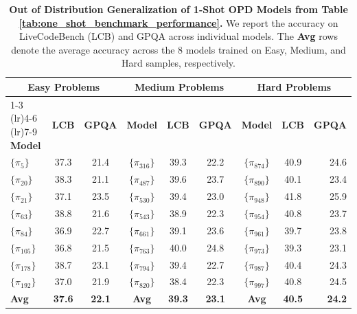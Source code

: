 \begin{table}[htbp]
\centering
\caption{\textbf{Out of Distribution Generalization of 1-Shot OPD Models from Table \ref{tab:one_shot_benchmark_performance}.} We report the accuracy on LiveCodeBench (LCB) and GPQA across individual models. The \textbf{Avg} rows denote the average accuracy across the 8 models trained on Easy, Medium, and Hard samples, respectively.}
\label{tab:ood_1shot_models}
\small
\begin{tabular}{lcccccccr}
\toprule
\multicolumn{3}{c}{\textbf{Easy Problems}} & \multicolumn{3}{c}{\textbf{Medium Problems}} & \multicolumn{3}{c}{\textbf{Hard Problems}} \\
\cmidrule(lr){1-3} \cmidrule(lr){4-6} \cmidrule(lr){7-9}
\textbf{Model} & \textbf{LCB} & \textbf{GPQA} & \textbf{Model} & \textbf{LCB} & \textbf{GPQA} & \textbf{Model} & \textbf{LCB} & \textbf{GPQA} \\
\midrule
$\{\pi_{5}\}$ & 37.3 & 21.4 & $\{\pi_{316}\}$ & 39.3 & 22.2 & $\{\pi_{874}\}$ & 40.9 & 24.6 \\
$\{\pi_{20}\}$ & 38.3 & 21.1 & $\{\pi_{487}\}$ & 39.6 & 23.7 & $\{\pi_{890}\}$ & 40.1 & 23.4 \\
$\{\pi_{21}\}$ & 37.1 & 23.5 & $\{\pi_{530}\}$ & 39.4 & 23.0 & $\{\pi_{948}\}$ & 41.8 & 25.9 \\
$\{\pi_{63}\}$ & 38.8 & 21.6 & $\{\pi_{543}\}$ & 38.9 & 22.3 & $\{\pi_{954}\}$ & 40.8 & 23.7 \\
$\{\pi_{84}\}$ & 36.9 & 22.7 & $\{\pi_{661}\}$ & 39.1 & 23.6 & $\{\pi_{961}\}$ & 39.7 & 23.8 \\
$\{\pi_{105}\}$ & 36.8 & 21.5 & $\{\pi_{763}\}$ & 40.0 & 24.8 & $\{\pi_{973}\}$ & 39.3 & 23.1 \\
$\{\pi_{178}\}$ & 38.7 & 23.1 & $\{\pi_{794}\}$ & 39.4 & 22.7 & $\{\pi_{987}\}$ & 40.4 & 24.3 \\
$\{\pi_{192}\}$ & 37.0 & 21.9 & $\{\pi_{820}\}$ & 38.4 & 22.3 & $\{\pi_{997}\}$ & 40.8 & 24.5 \\
\midrule
\textbf{Avg} & \textbf{37.6} & \textbf{22.1} & \textbf{Avg} & \textbf{39.3} & \textbf{23.1} & \textbf{Avg} & \textbf{40.5} & \textbf{24.2} \\
\bottomrule
\end{tabular}


\end{table}

